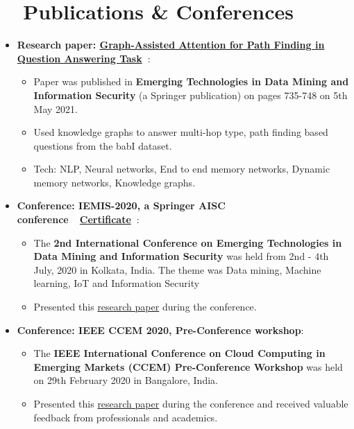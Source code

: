 \documentclass[a4paper,20pt]{article}
\newcommand{\resumeItem}[2]{
  \item\small{
    \textbf{#1}{: #2 \vspace{-2pt}}
  }
}
\newcommand{\resumeSubItem}[2]{\resumeItem{#1}{#2}\vspace{-3pt}}
\newcommand{\resumeSubHeadingListStart}{\begin{itemize}[leftmargin=*]}
\newcommand{\resumeSubHeadingListEnd}{\end{itemize}}
\newcommand{\resumeItemListStart}{\begin{itemize}}
\newcommand{\resumeItemListEnd}{\end{itemize}\vspace{-5pt}}
\begin{document}
\section{~~Publications \& Conferences}
\resumeSubHeadingListStart
\resumeSubItem{Research paper: \color{blue}\href{https://link.springer.com/chapter/10.1007/978-981-15-9774-9_68}{Graph-Assisted Attention for Path Finding in Question Answering Task}~\footnotesize{\faIcon{link}}}{}
\resumeItemListStart
\item\small{Paper was published in \textbf{Emerging Technologies in Data Mining and Information Security} (a Springer publication) on pages 735-748 on 5th May 2021.}
\item\small{Used knowledge graphs to answer multi-hop type, path finding based questions from the babI dataset.}
\item\small{Tech: NLP, Neural networks, End to end memory networks, Dynamic memory networks, Knowledge graphs.}
\resumeItemListEnd
\vspace{2pt}
\resumeSubItem{Conference: IEMIS-2020, a Springer AISC conference~~\color{blue}\href{https://bit.ly/3FJkaq8}{Certificate}~\footnotesize{\faIcon{link}}}{}
\resumeItemListStart
\item\small{The \textbf{2nd International Conference on Emerging Technologies in Data Mining and Information Security} was held from 2nd - 4th July, 2020 in Kolkata, India. The theme was Data mining, Machine learning, IoT and Information Security}
\item\small{Presented this {\color{blue}\href{https://bit.ly/3xnp758}{research paper}} during the conference.}
\resumeItemListEnd
\vspace{2pt}
\resumeSubItem{Conference: IEEE CCEM 2020, Pre-Conference workshop}{}
\resumeItemListStart
\item\small{The \textbf{IEEE International Conference on Cloud Computing in Emerging Markets (CCEM) Pre-Conference Workshop} was held on 29th February 2020 in Bangalore, India.}
\item\small{Presented this {\color{blue}\href{https://bit.ly/2Zm3BBc}{research paper}} during the conference and received valuable feedback from professionals and academics.}
\resumeItemListEnd
\resumeSubHeadingListEnd
\vspace{-5pt}
\end{document}
